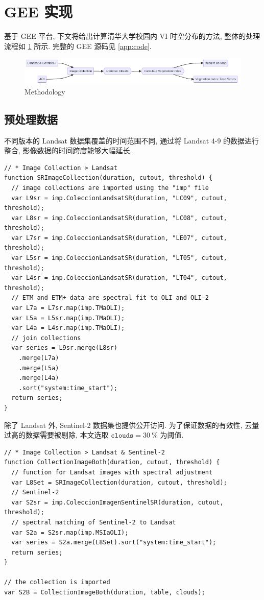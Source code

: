
\section{GEE 实现}

基于 GEE 平台, 下文将给出计算清华大学校园内 VI 时空分布的方法, 整体的处理流程如 \cref{fig:flow} 所示.
完整的 GEE 源码见 \cref{app:code}.

\begin{figure}[htbp]
  \centering
  \includegraphics[width=\linewidth]{assets/flow-chart.png}
  \caption{Methodology}
  \label{fig:flow}
\end{figure}

\subsection{预处理数据}

不同版本的 Landsat 数据集覆盖的时间范围不同, 通过将 Landsat 4-9 的数据进行整合, 影像数据的时间跨度能够大幅延长.

\begin{verbatim}
// * Image Collection > Landsat
function SRImageCollection(duration, cutout, threshold) {
  // image collections are imported using the "imp" file
  var L9sr = imp.ColeccionLandsatSR(duration, "LC09", cutout, threshold);
  var L8sr = imp.ColeccionLandsatSR(duration, "LC08", cutout, threshold);
  var L7sr = imp.ColeccionLandsatSR(duration, "LE07", cutout, threshold);
  var L5sr = imp.ColeccionLandsatSR(duration, "LT05", cutout, threshold);
  var L4sr = imp.ColeccionLandsatSR(duration, "LT04", cutout, threshold);
  // ETM and ETM+ data are spectral fit to OLI and OLI-2
  var L7a = L7sr.map(imp.TMaOLI);
  var L5a = L5sr.map(imp.TMaOLI);
  var L4a = L4sr.map(imp.TMaOLI);
  // join collections
  var series = L9sr.merge(L8sr)
    .merge(L7a)
    .merge(L5a)
    .merge(L4a)
    .sort("system:time_start");
  return series;
}
\end{verbatim}

除了 Landsat 外, Sentinel-2 数据集也提供公开访问.
为了保证数据的有效性, 云量过高的数据需要被剔除, 本文选取 $\mathtt{clouds} = \SI{30}{\percent}$ 为阈值.

\begin{verbatim}
// * Image Collection > Landsat & Sentinel-2
function CollectionImageBoth(duration, cutout, threshold) {
  // function for Landsat images with spectral adjustment
  var L8Set = SRImageCollection(duration, cutout, threshold);
  // Sentinel-2
  var S2sr = imp.ColeccionImagenSentinelSR(duration, cutout, threshold);
  // spectral matching of Sentinel-2 to Landsat
  var S2a = S2sr.map(imp.MSIaOLI);
  var series = S2a.merge(L8Set).sort("system:time_start");
  return series;
}

// the collection is imported
var S2B = CollectionImageBoth(duration, table, clouds);
\end{verbatim}

